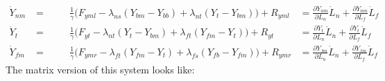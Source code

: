 \documentclass[9pt,twoside,lineno]{pnas-new}
\begin{document}
\begin{align}
  \dot{Y}_{nm} &= \hspace{1cm} \frac{1}{\gamma} \Big(F_{yml} - \lambda_{ns}(Y_{bm} - Y_{bb})
  + \lambda_{nt}(Y_{t } - Y_{bm}) \Big) + R_{yml}
  &= \frac{\partial Y_{nm}}{\partial L_n}\dot{L}_n + \frac{\partial Y_{nm}}{\partial L_f}\dot{L}_f\\
  \dot{Y}_{t}  &= \hspace{1cm} \frac{1}{\gamma} \Big(F_{yt } - \lambda_{nt}(Y_{t } - Y_{bm})
  + \lambda_{ft}(Y_{fm} - Y_{t }) \Big) + R_{yt }
  &= \frac{\partial Y_{t}}{\partial L_n}\dot{L}_n + \frac{\partial Y_{t}}{\partial L_f}\dot{L}_f\\
  \dot{Y}_{fm} &= \hspace{1cm} \frac{1}{\gamma} \Big(F_{ymr} - \lambda_{ft}(Y_{fm} - Y_{t })
  + \lambda_{fs}(Y_{fb} - Y_{fm}) \Big) + R_{ymr}
  &= \frac{\partial Y_{fm}}{\partial L_n}\dot{L}_n + \frac{\partial Y_{fm}}{\partial L_f}\dot{L}_f
\end{align}
%
The matrix version of this system looks like:
\end{document}
